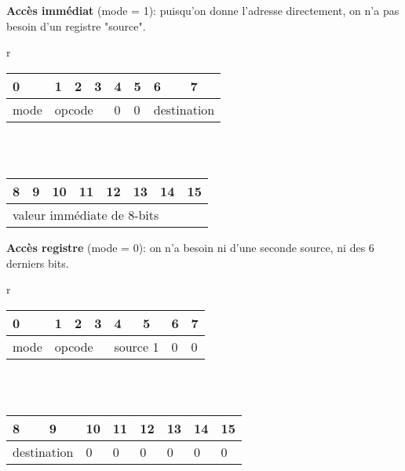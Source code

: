 \documentclass[a4paper]{article}
\newcommand{\bluecell}{\cellcolor{blue!25}}
\begin{document}
\textbf{Accès immédiat} (mode = 1): puisqu'on donne l'adresse directement, on n'a pas besoin d'un registre "source".
\begin{center}
    \begin{tabular}{r}
        \begin{tabular}{|p{1cm}|p{1cm}|p{1cm}|p{1cm}|p{1cm}|p{1cm}|p{1cm}|p{1cm}|} \hline
            0 & 1 & 2 & 3 & 4 & 5 & 6 & 7 \\ \hline
            mode & \multicolumn{3}{l|}{opcode} & \multicolumn{1}{l|}{\bluecell 0} & \multicolumn{1}{l|}{\bluecell 0} & \multicolumn{2}{l|}{destination} \\ \hline
        \end{tabular}
        \\ \\
        \begin{tabular}{|p{1cm}|p{1cm}|p{1cm}|p{1cm}|p{1cm}|p{1cm}|p{1cm}|p{1cm}|} \hline
            8 & 9 & 10 & 11 & 12 & 13 & 14 & 15 \\ \hline
            \multicolumn{8}{|l|}{valeur immédiate de 8-bits} \\ \hline
        \end{tabular}
    \end{tabular}
\end{center}

\textbf{Accès registre} (mode = 0): on n'a besoin ni d'une seconde source, ni des 6 derniers bits.
\begin{center}
    \begin{tabular}{r}
        \begin{tabular}{|p{1cm}|p{1cm}|p{1cm}|p{1cm}|p{1cm}|p{1cm}|p{1cm}|p{1cm}|} \hline
            0 & 1 & 2 & 3 & 4 & 5 & 6 & 7 \\ \hline
            mode & \multicolumn{3}{l|}{opcode} & \multicolumn{2}{l|}{source 1} & \multicolumn{1}{l|}{\bluecell 0} & \multicolumn{1}{l|}{\bluecell 0} \\ \hline
        \end{tabular}
        \\ \\
        \begin{tabular}{|p{1cm}|p{1cm}|p{1cm}|p{1cm}|p{1cm}|p{1cm}|p{1cm}|p{1cm}|} \hline
            8 & 9 & 10 & 11 & 12 & 13 & 14 & 15 \\ \hline
            \multicolumn{2}{|l|}{destination} & \bluecell 0 & \bluecell 0 & \bluecell 0 & \bluecell 0 & \bluecell 0 & \bluecell 0 \\ \hline
        \end{tabular}
    \end{tabular}
\end{center}
\end{document}

